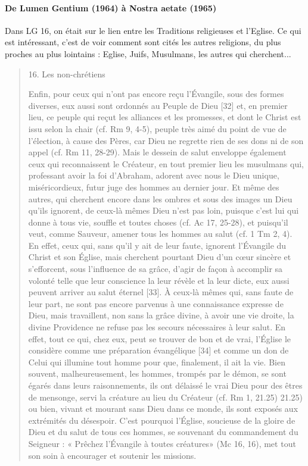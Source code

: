    \paragraph{De Lumen Gentium (1964) à Nostra aetate (1965)}
   Dans LG 16, on était sur le lien entre les Traditions religieuses et l'Eglise. Ce qui est intéressant, c'est de voir comment sont cités les autres religions, du plus proches au plus lointains : Eglise, Juifs, Musulmans, les autres qui cherchent...
   \begin{quote}
       16. Les non-chrétiens

Enfin, pour ceux qui n’ont pas encore reçu l’Évangile, sous des formes diverses, eux aussi sont ordonnés au Peuple de Dieu [32] et, en premier lieu, ce peuple qui reçut les alliances et les promesses, et dont le Christ est issu selon la chair (cf. Rm 9, 4-5), peuple très aimé du point de vue de l’élection, à cause des Pères, car Dieu ne regrette rien de ses dons ni de son appel (cf. Rm 11, 28-29). Mais le dessein de salut enveloppe également ceux qui reconnaissent le Créateur, en tout premier lieu les musulmans qui, professant avoir la foi d’Abraham, adorent avec nous le Dieu unique, miséricordieux, futur juge des hommes au dernier jour. Et même des autres, qui cherchent encore dans les ombres et sous des images un Dieu qu’ils ignorent, de ceux-là mêmes Dieu n’est pas loin, puisque c’est lui qui donne à tous vie, souffle et toutes choses (cf. Ac 17, 25-28), et puisqu’il veut, comme Sauveur, amener tous les hommes au salut (cf. 1 Tm 2, 4). En effet, ceux qui, sans qu’il y ait de leur faute, ignorent l’Évangile du Christ et son Église, mais cherchent pourtant Dieu d’un cœur sincère et s’efforcent, sous l’influence de sa grâce, d’agir de façon à accomplir sa volonté telle que leur conscience la leur révèle et la leur dicte, eux aussi peuvent arriver au salut éternel [33]. À ceux-là mêmes qui, sans faute de leur part, ne sont pas encore parvenus à une connaissance expresse de Dieu, mais travaillent, non sans la grâce divine, à avoir une vie droite, la divine Providence ne refuse pas les secours nécessaires à leur salut. En effet, tout ce qui, chez eux, peut se trouver de bon et de vrai, l’Église le considère comme une préparation évangélique [34] et comme un don de Celui qui illumine tout homme pour que, finalement, il ait la vie. Bien souvent, malheureusement, les hommes, trompés par le démon, se sont égarés dans leurs raisonnements, ils ont délaissé le vrai Dieu pour des êtres de mensonge, servi la créature au lieu du Créateur (cf. Rm 1, 21.25) 21.25) ou bien, vivant et mourant sans Dieu dans ce monde, ils sont exposés aux extrémités du désespoir. C’est pourquoi l’Église, soucieuse de la gloire de Dieu et du salut de tous ces hommes, se souvenant du commandement du Seigneur : « Prêchez l’Évangile à toutes créatures» (Mc 16, 16), met tout son soin à encourager et soutenir les missions.
   \end{quote}
